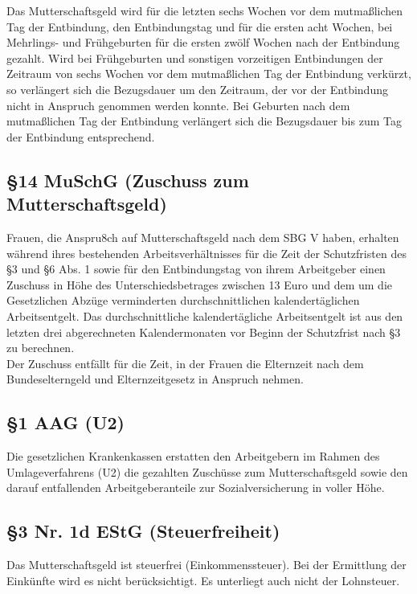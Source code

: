 \documentclass[a4paper, 12pt]{report}
\begin{document}
Das Mutterschaftsgeld wird für die letzten sechs Wochen vor dem mutmaßlichen Tag
der Entbindung, den Entbindungstag und für die ersten acht Wochen, bei
Mehrlings- und Frühgeburten für die ersten zwölf Wochen nach der Entbindung
gezahlt. Wird bei Frühgeburten und sonstigen vorzeitigen Entbindungen der
Zeitraum von sechs Wochen vor dem mutmaßlichen Tag der Entbindung verkürzt, so
verlängert sich die Bezugsdauer um den Zeitraum, der vor der Entbindung nicht in
Anspruch genommen werden konnte. Bei Geburten nach dem mutmaßlichen Tag der
Entbindung verlängert sich die Bezugsdauer bis zum Tag der Entbindung
entsprechend.

\subsection{\S 14 MuSchG (Zuschuss zum Mutterschaftsgeld)}

Frauen, die Anspru8ch auf Mutterschaftsgeld nach dem SBG V haben, erhalten
während ihres bestehenden Arbeitsverhältnisses für die Zeit der Schutzfristen
des \S 3 und \S 6 Abs. 1 sowie für den Entbindungstag von ihrem Arbeitgeber
einen Zuschuss in Höhe des Unterschiedsbetrages zwischen 13 Euro und dem um die
Gesetzlichen Abzüge verminderten durchschnittlichen kalendertäglichen
Arbeitsentgelt. Das durchschnittliche kalendertägliche Arbeitsentgelt ist aus
den letzten drei abgerechneten Kalendermonaten vor Beginn der Schutzfrist nach
\S 3 zu berechnen. \\

Der Zuschuss entfällt für die Zeit, in der Frauen die Elternzeit nach dem
Bundeselterngeld und Elternzeitgesetz in Anspruch nehmen.

\subsection{\S 1 AAG (U2)}

Die gesetzlichen Krankenkassen erstatten den Arbeitgebern im Rahmen des
Umlageverfahrens (U2) die gezahlten Zuschüsse zum Mutterschaftsgeld sowie den
darauf entfallenden Arbeitgeberanteile zur Sozialversicherung in voller Höhe.

\subsection{\S 3 Nr. 1d EStG (Steuerfreiheit)}

Das Mutterschaftsgeld ist steuerfrei (Einkommenssteuer). Bei der Ermittlung der
Einkünfte wird es nicht berücksichtigt. Es unterliegt auch nicht der Lohnsteuer.
\end{document}

